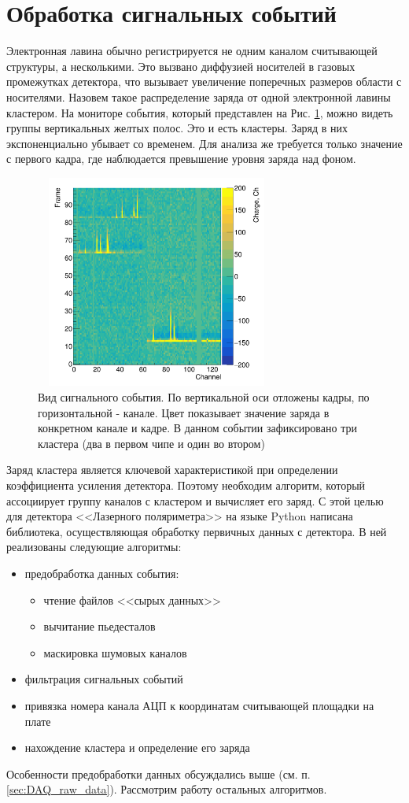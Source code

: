 \section{Обработка сигнальных событий}
Электронная лавина обычно регистрируется не одним каналом считывающей структуры, а несколькими. Это вызвано диффузией носителей в газовых промежутках детектора, что вызывает увеличение поперечных размеров области с носителями. Назовем такое распределение заряда от одной электронной лавины кластером. На мониторе события, который представлен на Рис. \ref{event_map}, можно видеть группы вертикальных желтых полос. Это и есть кластеры. Заряд в них экспоненциально убывает со временем. Для анализа же требуется только значение с первого кадра, где наблюдается превышение уровня заряда над фоном.   
\begin{figure}[H]
	\begin{center}
		\includegraphics[width = 8cm, height = 7cm]{img/Signal.png}
		\caption{Вид сигнального события. По вертикальной оси отложены кадры, по горизонтальной - канале. Цвет показывает значение заряда в конкретном канале и кадре. В данном событии зафиксировано три кластера (два в первом чипе и один во втором)}
		\label{event_map}
	\end{center}
\end{figure}
 Заряд кластера является ключевой характеристикой при определении коэффициента усиления детектора. Поэтому необходим алгоритм, который ассоциирует группу каналов с кластером и вычисляет его заряд. С этой целью для детектора <<Лазерного поляриметра>> на языке Python написана библиотека, осуществляющая обработку первичных данных с детектора. В ней реализованы следующие алгоритмы:
 \begin{itemize}
 	\item предобработка данных события:
 	\begin{itemize}[label=$\circ$]
 		\item чтение файлов <<сырых данных>>
 		\item вычитание пьедесталов
 		\item маскировка шумовых каналов
 	\end{itemize}
 	\item фильтрация сигнальных событий
 	\item привязка номера канала АЦП к координатам считывающей площадки на плате
 	\item нахождение кластера и определение его заряда
 \end{itemize}
Особенности предобработки данных обсуждались выше (см. п. \ref{sec:DAQ_raw_data}). Рассмотрим работу остальных алгоритмов.
